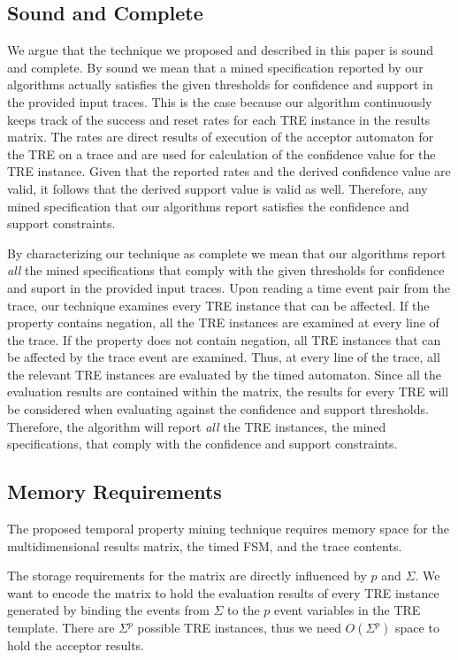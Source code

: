 \documentclass[]{sigplanconf}
\begin{document}
\subsection{Sound and Complete}

We argue that the technique we proposed and described in this paper is sound and complete. By sound we mean that a mined specification reported by our algorithms actually satisfies the given thresholds for confidence and support in the provided input traces. This is the case because our algorithm continuously keeps track of the success and reset rates for each TRE instance in the results matrix. The rates are direct results of execution of the acceptor automaton for the TRE on a trace and are used for calculation of the confidence value for the TRE instance. Given that the reported rates and the derived confidence value are valid, it follows that the derived support value is valid as well. Therefore, any mined specification that our algorithms report satisfies the confidence and support constraints.

By characterizing our technique as complete we mean that our algorithms report \emph{all} the mined specifications that comply with the given thresholds for confidence and suport in the provided input traces. Upon reading a time event pair from the trace, our technique examines every TRE instance that can be affected. If the property contains negation, all the TRE instances are examined at every line of the trace. If the property does not contain negation, all TRE instances that can be affected by the trace event are examined. Thus, at every line of the trace, all the relevant TRE instances are evaluated by the timed automaton. Since all the evaluation results are contained within the matrix, the results for every TRE will be considered when evaluating against the confidence and support thresholds. Therefore, the algorithm will report \emph{all} the TRE instances, the mined specifications, that comply with the confidence and support constraints.


\subsection{Memory Requirements}

The proposed temporal property mining technique requires memory space for the multidimensional results matrix, the timed FSM, and the trace contents.

The storage requirements for the matrix are directly influenced by $p$ and $\Sigma$.
We want to encode the matrix to hold the evaluation results of every TRE instance generated by binding the events from $\Sigma$ to the $p$ event variables in the TRE template. There are $\Sigma^p$ possible TRE instances, thus we need $O(\Sigma^p)$ space to hold the acceptor results.
\end{document}
